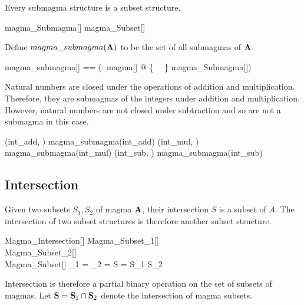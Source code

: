 \documentclass{amsart}
\begin{document}
\begin{remark}
Every submagma structure is a subset structure.

\begin{zed}
	magma\_Submagma[\setT] \subseteq magma\_Subset[\setT]
\end{zed}

\end{remark}

Define $magma\_submagma(\mathbf{A})$ to be the set of all submagmas of $\mathbf{A}$.

\begin{zed}
	magma\_submagma[\genT] == (\lambda \strucA: magma[\genT] @ \{~ \strucA ~\} \dres magma\_Submagma[\genT])
\end{zed}

\begin{example}
Natural numbers are closed under the operations of addition and multiplication.
Therefore, they are submagmas of the integers under addition and multiplication.
However, natural numbers are not closed under subtraction and so are not
a submagma in this case.

\begin{zed}
	(int\_add, \nat) \in magma\_submagma(int\_add)
\also
	(int\_mul, \nat) \in magma\_submagma(int\_mul)
\also
	(int\_sub, \nat) \notin magma\_submagma(int\_sub)
\end{zed}

\end{example}

\subsection{Intersection}

Given two subsets $S_1, S_2$ of magma $\mathbf{A}$, their intersection $S$ is a subset
of $A$. The intersection of two subset structures is therefore another subset structure.

\begin{schema}{Magma\_Intersection}[\genT]
	Magma\_Subset_1[\genT] \\
	Magma\_Subset_2[\genT] \\
	Magma\_Subset[\genT]
\where
	\strucA_1 = \strucA_2 = \strucA
\also
	S = S_1 \cap S_2
\end{schema}

Intersection is therefore a partial binary operation on the set of subsets of magmas.
Let $\mathbf{S} = \mathbf{S}_1 \mathbin{\cap} \mathbf{S}_2$ denote the intersection of magma subsets.
\end{document}
